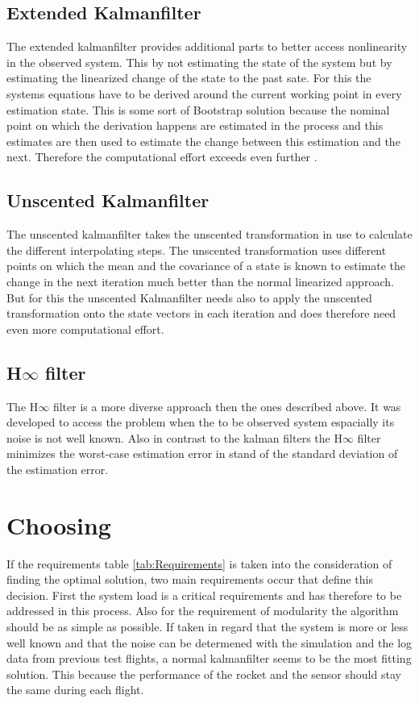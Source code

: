   \subsection{Extended Kalmanfilter}
  The extended kalmanfilter provides additional parts to better access nonlinearity in the observed system.
  This by not estimating the state of the system but by estimating the linearized change of the state 
  to the past sate. For this the systems equations have to be derived around the current working point in every estimation state.
  This is some sort of Bootstrap solution because the nominal point on which the derivation happens are estimated in the process and
  this estimates are then used to estimate the change between this estimation and the next.
  Therefore the computational effort exceeds even further \cite{SimonDan2006Ose:}.
  
  \subsection{Unscented Kalmanfilter}
  The unscented kalmanfilter takes the unscented transformation in use to calculate the different interpolating steps.
  The unscented transformation uses different points on which the mean and the covariance of a state is known to estimate the 
  change in the next iteration much better than the normal linearized approach.
  But for this the unscented Kalmanfilter needs also to apply the unscented transformation onto the state vectors in each iteration
  and does therefore need even more computational effort.
  
  \subsection{H$\infty$ filter}
  The H$\infty$ filter is a more diverse approach then the ones described above.
  It was developed to access the problem when the to be observed system espacially its noise is not well known.
  Also in contrast to the kalman filters the H$\infty$ filter minimizes the worst-case estimation error 
  in stand of the standard deviation of the estimation error.
  
  \section{Choosing}
  If the requirements table \ref{tab:Requirements} is taken into the consideration of finding
  the optimal solution, two main requirements occur that define this decision.
  First the system load is a critical requirements and has therefore to be addressed in this process.
  Also for the requirement of modularity the algorithm should be as simple as possible.
  If taken in regard that the system is more or less well known and that the noise can be
  determened with the simulation and the log data from previous test flights,
  a normal kalmanfilter seems to be the most fitting solution.
  This because the performance of the rocket and the sensor should stay the same during
  each flight. 
  
